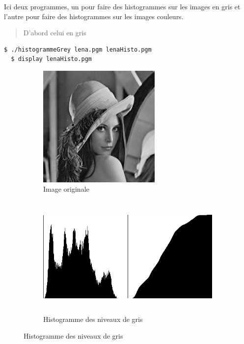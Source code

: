 \documentclass[a4paper,10pt]{article}
\begin{document}
    Ici deux programmes, un pour faire des histogrammes sur les images en gris et l'autre pour faire des histogrammes sur les images couleurs.
    \begin{quote}
    D'abord celui en gris
    \end{quote}
    \begin{lstlisting}[language=Bash]
  $ ./histogrammeGrey lena.pgm lenaHisto.pgm     
  $ display lenaHisto.pgm
  \end{lstlisting}
  \begin{figure}[h]
   \begin{subfigure}{1\textwidth}
    \centering
    \includegraphics[width=0.6\linewidth, height=6cm]{lena}
    \caption{Image originale}
    \label{fig:lenaO}
    \end{subfigure}
     \begin{subfigure}{1\textwidth}
    \centering
    \includegraphics[width=1\linewidth, height=6cm]{lenaHisto}   
    \caption{Histogramme des niveaux de gris}
    \label{fig:lenaHisto}
    \end{subfigure}
    \end{figure}
    \pagebreak
    
\end{document}
